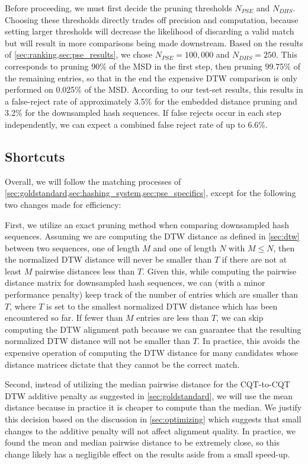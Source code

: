 Before proceeding, we must first decide the pruning thresholds $N_{PSE}$ and $N_{DHS}$.
Choosing these thresholds directly trades off precision and computation, because setting larger thresholds will decrease the likelihood of discarding a valid match but will result in more comparisons being made downstream.
Based on the results of \cref{sec:ranking,sec:pse_results}, we chose $N_{PSE} = 100,000$ and $N_{DHS} = 250$.
This corresponds to pruning 90\% of the MSD in the first step, then pruning 99.75\% of the remaining entries, so that in the end the expensive DTW comparison is only performed on 0.025\% of the MSD.
According to our test-set results, this results in a false-reject rate of approximately 3.5\% for the embedded distance pruning and 3.2\% for the downsampled hash sequences.
If false rejects occur in each step independently, we can expect a combined false reject rate of up to 6.6\%.

\subsection{Shortcuts}

Overall, we will follow the matching processes of \cref{sec:goldstandard,sec:hashing_system,sec:pse_specifics}, except for the following two changes made for efficiency:

First, we utilize an exact pruning method when comparing downsampled hash sequences.
Assuming we are computing the DTW distance as defined in \cref{sec:dtw} between two sequences, one of length $M$ and one of length $N$ with $M \le N$, then the normalized DTW distance will never be smaller than $T$ if there are not at least $M$ pairwise distances less than $T$.
Given this, while computing the pairwise distance matrix for downsampled hash sequences, we can (with a minor performance penalty) keep track of the number of entries which are smaller than $T$, where $T$ is set to the smallest normalized DTW distance which has been encountered so far.
If fewer than $M$ entries are less than $T$, we can skip computing the DTW alignment path because we can guarantee that the resulting normalized DTW distance will not be smaller than $T$.
In practice, this avoids the expensive operation of computing the DTW distance for many candidates whose distance matrices dictate that they cannot be the correct match.

Second, instead of utilizing the median pairwise distance for the CQT-to-CQT DTW additive penalty as suggested in \cref{sec:goldstandard}, we will use the mean distance because in practice it is cheaper to compute than the median.
We justify this decision based on the discussion in \cref{sec:optimizing} which suggests that small changes to the additive penalty will not affect alignment quality.
In practice, we found the mean and median pairwise distance to be extremely close, so this change likely has a negligible effect on the results aside from a small speed-up.

